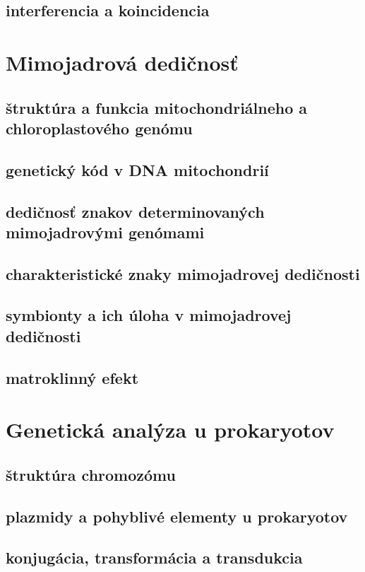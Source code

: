 \subsection{interferencia a koincidencia}

\section{Mimojadrová dedičnosť}
\subsection{štruktúra a funkcia mitochondriálneho a chloroplastového genómu}
\subsection{genetický kód v DNA mitochondrií}
\subsection{dedičnosť znakov determinovaných mimojadrovými genómami}
\subsection{charakteristické znaky mimojadrovej dedičnosti}
\subsection{symbionty a ich úloha v mimojadrovej dedičnosti}
\subsection{matroklinný efekt}

\section{Genetická analýza u prokaryotov}
\subsection{štruktúra chromozómu}
\subsection{plazmidy a pohyblivé elementy u prokaryotov}
\subsection{konjugácia, transformácia a transdukcia}

